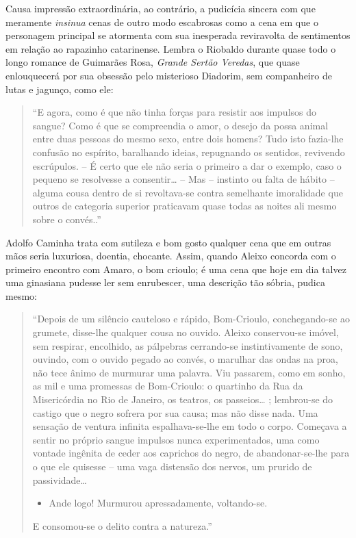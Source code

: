 \documentclass[
  letterpaper,
  DIV=11,
  numbers=noendperiod]{scrreprt}
\providecommand{\tightlist}{%
  \setlength{\itemsep}{0pt}\setlength{\parskip}{0pt}}\usepackage{longtable,booktabs,array}
\begin{document}
Causa impressão extraordinária, ao contrário, a pudicícia sincera com
que meramente \emph{insinua} cenas de outro modo escabrosas como a cena
em que o personagem principal se atormenta com sua inesperada
reviravolta de sentimentos em relação ao rapazinho catarinense. Lembra o
Riobaldo durante quase todo o longo romance de Guimarães Rosa,
\emph{Grande Sertão Veredas}, que quase enlouquecerá por sua obsessão
pelo misterioso Diadorim, sem companheiro de lutas e jagunço, como ele:

\begin{quote}
``E agora, como é que não tinha forças para resistir aos impulsos do
sangue? Como é que se compreendia o amor, o desejo da possa animal entre
duas pessoas do mesmo sexo, entre dois homens? Tudo isto fazia-lhe
confusão no espírito, baralhando ideias, repugnando os sentidos,
revivendo escrúpulos. -- É certo que ele não seria o primeiro a dar o
exemplo, caso o pequeno se resolvesse a consentir\ldots{} -- Mas --
instinto ou falta de hábito -- alguma cousa dentro de si revoltava-se
contra semelhante imoralidade que outros de categoria superior
praticavam quase todas as noites ali mesmo sobre o convés..''
\end{quote}

Adolfo Caminha trata com sutileza e bom gosto qualquer cena que em
outras mãos seria luxuriosa, doentia, chocante. Assim, quando Aleixo
concorda com o primeiro encontro com Amaro, o bom crioulo; é uma cena
que hoje em dia talvez uma ginasiana pudesse ler sem enrubescer, uma
descrição tão sóbria, pudica mesmo:

\begin{quote}
``Depois de um silêncio cauteloso e rápido, Bom-Crioulo, conchegando-se
ao grumete, disse-lhe qualquer cousa no ouvido. Aleixo conservou-se
imóvel, sem respirar, encolhido, as pálpebras cerrando-se
instintivamente de sono, ouvindo, com o ouvido pegado ao convés, o
marulhar das ondas na proa, não tece ânimo de murmurar uma palavra. Viu
passarem, como em sonho, as mil e uma promessas de Bom-Crioulo: o
quartinho da Rua da Misericórdia no Rio de Janeiro, os teatros, os
passeios\ldots{} ; lembrou-se do castigo que o negro sofrera por sua
causa; mas não disse nada. Uma sensação de ventura infinita
espalhava-se-lhe em todo o corpo. Começava a sentir no próprio sangue
impulsos nunca experimentados, uma como vontade ingênita de ceder aos
caprichos do negro, de abandonar-se-lhe para o que ele quisesse -- uma
vaga distensão dos nervos, um prurido de passividade\ldots{}

\begin{itemize}
\tightlist
\item
  Ande logo! Murmurou apressadamente, voltando-se.
\end{itemize}

E consomou-se o delito contra a natureza.''
\end{quote}
\end{document}
